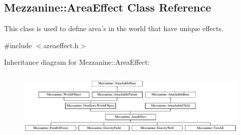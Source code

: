 \hypertarget{classMezzanine_1_1AreaEffect}{
\subsection{Mezzanine::AreaEffect Class Reference}
\label{classMezzanine_1_1AreaEffect}
}


This class is used to define area's in the world that have unique effects.  




{\ttfamily \#include $<$areaeffect.h$>$}

Inheritance diagram for Mezzanine::AreaEffect:\begin{figure}[H]
\begin{center}
\leavevmode
\includegraphics[height=3.317535cm]{classMezzanine_1_1AreaEffect}
\end{center}
\end{figure}
